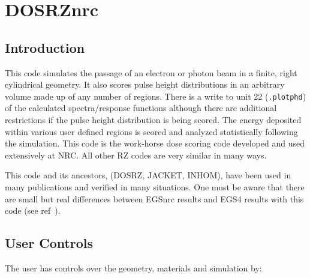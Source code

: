 \documentclass[12pt,twoside]{article}  %
\begin{document}
\section{DOSRZnrc}

\subsection{Introduction}

This code simulates the passage of an electron or photon beam in a finite,
right cylindrical geometry. It also scores pulse height distributions
in an arbitrary volume made up of any number of regions.  There is a
write to unit 22 ({\tt .plotphd}) of the calculated spectra/response
functions although there are additional restrictions if the pulse height
distribution is being scored.
The energy
deposited within various user defined regions is scored and analyzed
statistically following the simulation.  This code is the work-horse
dose scoring code developed and used extensively at NRC. All other RZ
codes are very similar in many ways.

This code and its ancestors, (DOSRZ, JACKET, INHOM),
have been used in many publications and verified in many
situations\cite{Ro82,Ro84a,RB85,SH86,RB86,RB90,KR93}.  One must be aware
that there are small but real differences between EGSnrc results and EGS4
results with this code (see ref~\cite{Wa00}).


\subsection{User Controls}

The user has controls over the geometry, materials and
simulation by:
\end{document}

